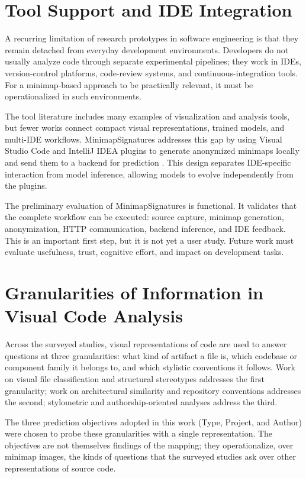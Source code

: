 \section{Tool Support and IDE Integration}

A recurring limitation of research prototypes in software engineering is that
they remain detached from everyday development environments. Developers do not
usually analyze code through separate experimental pipelines; they work in IDEs,
version-control platforms, code-review systems, and continuous-integration
tools. For a minimap-based approach to be practically relevant, it must be
operationalized in such environments.

The tool literature includes many examples of visualization and analysis tools,
but fewer works connect compact visual representations, trained models, and
multi-IDE workflows. MinimapSignatures addresses this gap by using Visual Studio
Code and IntelliJ IDEA plugins to generate anonymized minimaps locally and send
them to a backend for prediction \cite{gebara2026minimapsignatures}. This design
separates IDE-specific interaction from model inference, allowing models to
evolve independently from the plugins.

The preliminary evaluation of MinimapSignatures is functional. It validates that
the complete workflow can be executed: source capture, minimap generation,
anonymization, HTTP communication, backend inference, and IDE feedback. This is
an important first step, but it is not yet a user study. Future work must
evaluate usefulness, trust, cognitive effort, and impact on development tasks.

\section{Granularities of Information in Visual Code Analysis}

Across the surveyed studies, visual representations of code are used to answer
questions at three granularities: what kind of artifact a file is, which
codebase or component family it belongs to, and which stylistic conventions it
follows. Work on visual file classification and structural stereotypes
addresses the first granularity; work on architectural similarity and
repository conventions addresses the second; stylometric and
authorship-oriented analyses address the third.

The three prediction objectives adopted in this work (Type, Project, and
Author) were chosen to probe these granularities with a single representation.
The objectives are not themselves findings of the mapping; they operationalize,
over minimap images, the kinds of questions that the surveyed studies ask over
other representations of source code.

